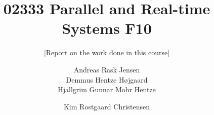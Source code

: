 \documentclass{acm_proc_article-sp}
\begin{document}
\title{02333 Parallel and Real-time Systems F10}
\subtitle{[Report on the work done in this course]
}
%
%
%
%
%

%
\author{
%
%
\alignauthor
Andreas Rask Jensen\\
\alignauthor
Demmus Hentze Højgaard\\
\alignauthor
Hjallgrim Gunnar Mohr Hentze\\
\and  %
\alignauthor 
Kim Rostgaard Christensen\\
}
\end{document}
